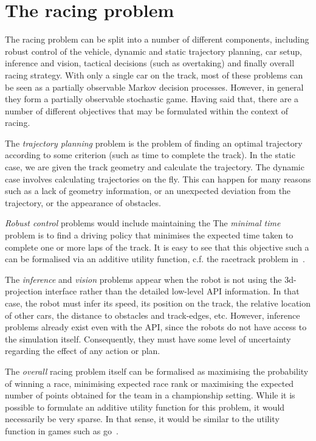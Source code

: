 \documentclass[a4paper]{article}
\begin{document}

\section{The racing problem}

The racing problem can be split into a number of different components, including robust control of the vehicle, dynamic and static trajectory planning, car setup, inference and vision, tactical decisions (such as overtaking) and finally overall racing strategy. With only a single car on the track, most of these problems can be seen as a partially observable Markov decision processes. However, in general they form a partially observable stochastic game. Having said that, there are a number of different objectives that may be formulated within the context of racing.

The \emph{trajectory planning} problem is the problem of finding an optimal trajectory according to some criterion (such as time to complete the track).
In the static case, we are given the track geometry and calculate the trajectory. The dynamic case involves calculating trajectories on the fly. This can happen for many reasons such as a lack of geometry information,  or an unexpected deviation from the trajectory, or the appearance of obstacles.

\emph{Robust control} problems would include maintaining the
The \emph{minimal time} problem is to find a driving policy that minimises the expected time taken to complete one or more laps of the track. It is easy to see that this objective such a can be formalised via an additive utility function, c.f. the racetrack problem in~\cite{Sutton+Barto:1998}.

The \emph{inference} and \emph{vision} problems appear when the robot is not using the 3d-projection interface rather than the detailed low-level API information. In that case, the robot must infer its speed, its position on the track, the relative location of other cars, the distance to obstacles and track-edges, etc. However, inference problems already exist even with the API, since the robots do not have access to the simulation itself. Consequently, they must have some level of uncertainty regarding the effect of any action or plan. 

The \emph{overall} racing problem itself can be formalised as maximising the probability of winning a race, minimising expected race rank or maximising the expected number of points obtained for the team in a championship setting. While it is possible to formulate an additive utility function for this problem, it would necessarily be very sparse. In that sense, it would be similar to the utility function in games such as go~\cite{gelly:uct-go}.
\end{document}
